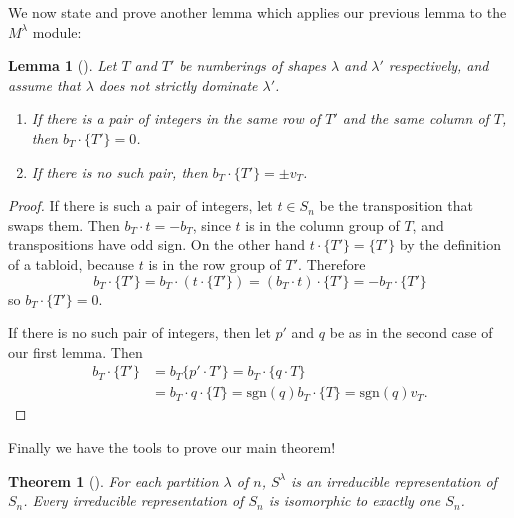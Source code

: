 \documentclass[12pt,twoside]{reedthesis}
\theoremstyle{plain}   %
\newtheorem{thm}{Theorem}[section] %
\newtheorem{lemma}{Lemma}[section]
\theoremstyle{definition}
\theoremstyle{remark}
\numberwithin{equation}{section}
\def\sgn{\mathrm{sgn}}
\begin{document}
  We now state and prove another lemma which applies our previous lemma to the $M^\lambda$ module:
  \begin{lemma}[{\cite[Lemma 7.2]{fulton}}]\label{lem2}
    Let $T$ and $T'$ be numberings of shapes $\lambda$ and $\lambda'$ respectively,
    and assume that $\lambda$ does not strictly dominate $\lambda'$. \\
    \begin{enumerate}

    \item If there is a pair of integers in the same row of $T'$ and the same column of $T$, then $b_T \cdot \{T'\} = 0$.
    \item If there is no such pair, then $b_T \cdot \{T'\} = \pm v_T$.
    \end{enumerate}
  \end{lemma}
  \begin{proof}    
    If there is such a pair of integers, let $t \in S_n$ be the transposition that swaps them.
    Then $b_T \cdot t = -b_T$, since $t$ is in the column group of $T$, and transpositions have odd sign.
    On the other hand $t \cdot \{T'\} = \{T'\}$ by the definition of a tabloid, because $t$ is in the row group of $T'$.
    Therefore
    \[b_T \cdot \{T'\} = b_T \cdot (t \cdot \{T'\}) = (b_T \cdot t) \cdot \{T'\} = - b_T \cdot \{T'\}\]
    so $b_T \cdot \{T'\} = 0$.\par
    If there is no such pair of integers, then let $p'$ and $q$ be as in the second case of our first lemma.
    Then
    \begin{align*}
      b_T \cdot \{ T'\} &=b_T \{p' \cdot T'\} = b_T \cdot \{ q \cdot T\} \\
                        &= b_T \cdot q \cdot \{T\} = \sgn(q) b_T \cdot \{T\} = \sgn(q) v_T.
    \end{align*}
  \end{proof}
  Finally we have the tools to prove our main theorem!
  \begin{thm}[{\cite[ Pg. 87-88]{fulton}}]
    For each partition $\lambda$ of $n$, $S^\lambda$ is an irreducible representation of $S_n$. Every irreducible representation of
    $S_n$ is isomorphic to exactly one $S_n$.
  \end{thm}
\end{document}
